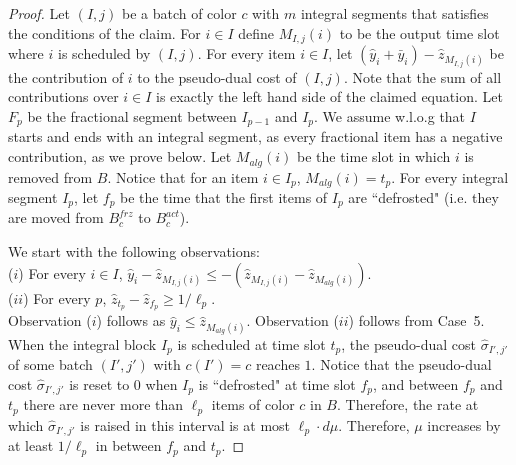\documentclass[12pt]{article}
\begin{document}
\begin{proof}
Let $(I,j)$ be a batch of color $c$ with $m$ integral segments 
that satisfies the conditions of the claim. For $i\in I$ define $M_{I,j}(i)$
to be the output time slot where $i$ is scheduled by $(I,j)$. For every item $i\in I$, let
$(\hat{y}_i+\bar{y}_i)-\hat{z}_{M_{I,j}(i)}$ be the contribution of $i$
to the pseudo-dual cost of $(I,j)$. 
Note that the sum of all contributions over $i\in I$ is exactly the left hand 
side of the claimed equation.
Let $F_p$ be the fractional segment between 
$I_{p-1}$ and $I_{p}$. We assume w.l.o.g that $I$ starts and ends with
an integral segment, as every fractional item has a negative contribution,
as we prove below.
Let $M_{alg}(i)$ be the time slot in which $i$ is removed from $B$.
Notice that for an item $i\in I_p$, $M_{alg}(i)=t_p$.
For every integral segment $I_p$, let $f_p$ be the time that the
first items of $I_p$ are ``defrosted" (i.e. they are moved from $B_c^{frz}$
to $B_c^{act}$).

We start with the following observations:\\
($i$) For every $i\in I$, $\hat{y}_i-\hat{z}_{M_{I,j}(i)}\le
-(\hat{z}_{M_{I,j}(i)}-\hat{z}_{M_{alg}(i)})$.\\
($ii$) For every $p$,
$\hat{z}_{t_p}-\hat{z}_{f_p} \ge 1/\ell_p$.\\
Observation ($i$) follows as $\hat{y}_i\le \hat{z}_{M_{alg}(i)}$.
Observation ($ii$) follows from  Case~5. When the integral block 
$I_p$ is scheduled at time slot $t_p$, the pseudo-dual cost 
$\hat{\sigma}_{I',j'}$ of some batch $(I',j')$ with $c(I') = c$ reaches $1$.
Notice that the pseudo-dual cost $\hat{\sigma }_{I',j'}$
is reset to $0$ when $I_p$ is ``defrosted" at time slot
$f_p$, and between $f_p$ and $t_p$ there are never more
than $\ell_p$ items of color $c$ in $B$. Therefore,
the rate at which $\hat{\sigma }_{I',j'}$ is raised in this
interval is at most $\ell_p\cdot d\mu$.
Therefore, $\mu$ increases by at least $1/\ell_p$ in between 
$f_p$ and $t_p$.


\end{proof}
\end{document}
